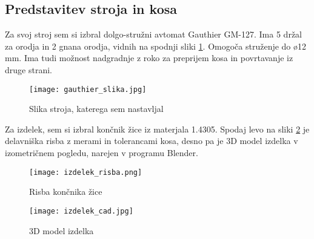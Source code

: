 \subsection{Predstavitev stroja in kosa}
Za svoj stroj sem si izbral dolgo-stružni avtomat Gauthier GM-127. 
Ima 5 držal za orodja in 2 gnana orodja, vidnih na spodnji 
sliki \ref{gauthier_priblizano}. Omogoča struženje do ø12 
mm. Ima tudi možnost nadgradnje z roko za preprijem kosa in 
povrtavanje iz druge strani.

\begin{figure}[H]
    \begin{center}
        \texttt{[image: gauthier\_slika.jpg]}
        \caption{Slika stroja, katerega sem nastavljal
        \cite{interna}}
        \label{gauthier_priblizano}
    \end{center}
\end{figure}

Za izdelek, sem si izbral končnik žice iz materjala 1.4305.
Spodaj levo na sliki \ref{delavniska_risba} je delavniška risba z 
merami in tolerancami kosa, desno pa je 3D model izdelka v izometričnem 
pogledu, narejen v programu Blender.

\begin{multicols}{2}
    \begin{figure}[H]
        \texttt{[image: izdelek\_risba.png]}
        \caption{Risba končnika žice
        \cite{interna}}
        \label{delavniska_risba}
    \end{figure}

    \columnbreak

    \begin{figure}[H]
        \texttt{[image: izdelek\_cad.jpg]}
        \caption{3D model izdelka
        \cite{lasten}}
        \label{3d_model}
    \end{figure}
\end{multicols}

\newpage